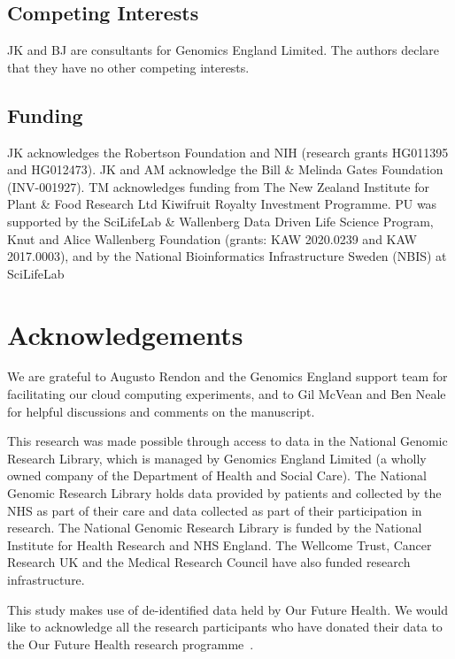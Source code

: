 \documentclass[a4paper,num-refs]{oup-contemporary}
\begin{document}
\subsection{Competing Interests}
JK and BJ are consultants for Genomics England Limited.
The authors declare that they have no other competing interests.

\subsection{Funding}
JK acknowledges the Robertson Foundation and
NIH (research grants HG011395 and HG012473).
JK and AM acknowledge the Bill \& Melinda Gates Foundation (INV-001927).
TM acknowledges funding from The New Zealand Institute for Plant \& Food
Research Ltd Kiwifruit Royalty Investment Programme.
PU was supported by the SciLifeLab \& Wallenberg Data Driven Life
Science Program, Knut and Alice Wallenberg Foundation (grants: KAW
2020.0239 and KAW 2017.0003), and by the National Bioinformatics
Infrastructure Sweden (NBIS) at SciLifeLab

\section{Acknowledgements}
We are grateful to Augusto Rendon and the Genomics 
England support team for facilitating our cloud computing experiments,
and to Gil McVean and Ben Neale for helpful discussions and comments on the 
manuscript.

This research was made possible through access to data in the National Genomic
Research Library, which is managed by Genomics England Limited (a wholly owned
company of the Department of Health and Social Care). The National Genomic
Research Library holds data provided by patients and collected by the NHS as
part of their care and data collected as part of their participation in
research. The National Genomic Research Library is funded by the National
Institute for Health Research and NHS England. The Wellcome Trust, Cancer
Research UK and the Medical Research Council have also funded research
infrastructure.

This study makes use of de-identified data held by Our Future Health.
We would like to acknowledge all the research participants who have donated
their data to the Our Future Health research programme~\cite{ofhpubpolicy}.
\end{document}
